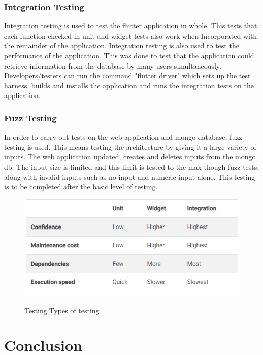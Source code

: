 \subsection{Integration Testing}

Integration testing is used to test the flutter application in whole. This tests that each function checked in unit and widget tests also work when Incorporated with the remainder of the application. Integration testing is also used to test the performance of the application. This was done to test that the application could retrieve information from the database by many users simultaneously. Developers/testers can run the command "flutter driver" which sets up the test harness, builds and installs the application and runs the integration tests on the application. \cite{IntegrationTest}

\subsection{Fuzz Testing}
In order to carry out tests on the web application and mongo database, fuzz testing is used. This means testing the architecture by giving it a large variety of inputs. The web application updated, creates and deletes inputs from the mongo db. The input size is limited and this limit is tested to the max though fuzz tests, along with invalid inputs such as no input and numeric input alone. This testing is to be completed after the basic level of testing.

\begin{figure}[ht!]
    \centering
 \includegraphics[width=125mm,scale=0.5]{img/Capture.PNG}
\caption{Testing:Types of testing}
\cite{testing}
\label{fig:method}
\end{figure}

\chapter{Conclusion}

 






 


